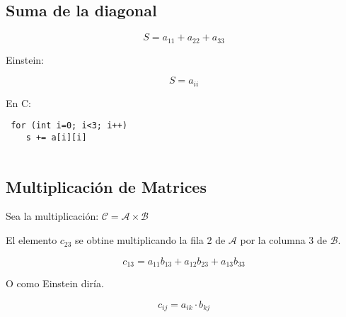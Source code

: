 \subsection*{Suma de la diagonal}

$$ S = a_{11} + a_{22} + a_{33} $$

Einstein:

$$ S = a_{ii} $$

En C:

\begin{lstlisting}
 for (int i=0; i<3; i++)
    s += a[i][i]
    
\end{lstlisting}

\subsection*{Multiplicación de Matrices}

Sea la multiplicación: $ \mathcal{C} =  \mathcal{A} \times \mathcal{B}$

El elemento $ c_{23} $ se obtine multiplicando la fila 2 de $\mathcal{A}$ por la columna 3 de $ \mathcal{B} $.

%

$$ 
 c_{13} = a_{11}b_{13} + a_{12}b_{23}  + a_{13}b_{33}
$$

O como Einstein diría.

$$
c_{ij} = a_{ik}\cdot b_{kj}
$$
